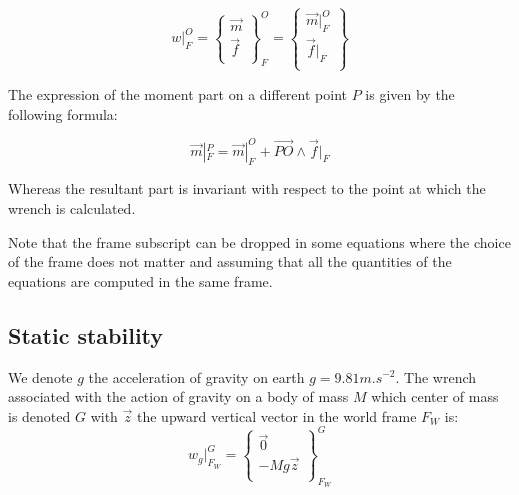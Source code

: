 \begin{equation}
  w|_F^O = \left\{ \begin{array}{r}
    \vec{m}\\
    \vec{f}\\
  \end{array} \right\}^O_F
  = \left\{ \begin{array}{r}
    \vec{m}|_F^O\\
    \vec{f}|_F\\
  \end{array}\right\}
\end{equation}

The expression of the moment part on a different point $P$ is given by the following formula:

\begin{equation}
  \vec{m}|_F^P = \vec{m}|_F^O + \overrightarrow{PO} \wedge \vec{f}|_F
\end{equation}

Whereas the resultant part is invariant with respect to the point at which the wrench is calculated.

Note that the frame subscript can be dropped in some equations where the choice of the frame does not matter and assuming that all the quantities of the equations are computed in the same frame.



\subsection{Static stability}
\label{sub:static_stability}


We denote $g$ the acceleration of gravity on earth $g = 9.81 m.s^{-2}$.
The wrench associated with the action of gravity on a body of mass $M$ which center of mass is denoted $G$ with $\vec{z}$ the upward vertical vector in the world frame $F_W$ is:
\begin{equation}
  w_g|^G_{F_W} = \left\{ \begin{array}{r}
     \vec{0} \\
     -Mg\vec{z} \\
 \end{array}\right\}^G_{F_W}
\end{equation}

